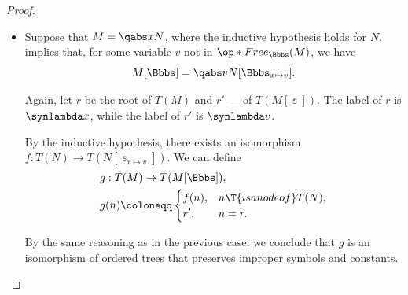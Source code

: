 \begin{proof}
\begin{itemize}
    We have shown that \( h \) is a bijective homomorphism of ordered rooted trees. A similar argument works for \( h^{-1} \). Therefore, \( h \) is an isomorphism of ordered trees.

    Finally, \( h \) preserves improper symbols and constants; for \( T(N) \) and \( T(K) \) this follows from the inductive hypothesis, while for \( r \) this follows by construction.

    \item Suppose that \( M = \qabs x N \), where the inductive hypothesis holds for \( N \).  implies that, for some variable \( v \) not in \( \op*{Free}_\Bbbs(M) \), we have
    \begin{equation*}
      M[\Bbbs] = \qabs v N[\Bbbs_{x \mapsto v}].
    \end{equation*}

    Again, let \( r \) be the root of \( T(M) \) and \( r' \) --- of \( T(M[\Bbbs]) \). The label of \( r \) is \( \synlambda x \), while the label of \( r' \) is \( \synlambda v \).

    By the inductive hypothesis, there exists an isomorphism \( f: T(N) \to T(N[\Bbbs_{x \mapsto v}]) \). We can define
    \begin{equation*}
      \begin{aligned}
        &g: T(M) \to T(M[\Bbbs]), \\
        &g(n) \coloneqq \begin{cases}
          f(n), &n \T{is a node of} T(N), \\
          r',   &n = r.
        \end{cases}
      \end{aligned}
    \end{equation*}

    By the same reasoning as in the previous case, we conclude that \( g \) is an isomorphism of ordered trees that preserves improper symbols and constants.
  \end{itemize}
\end{proof}

